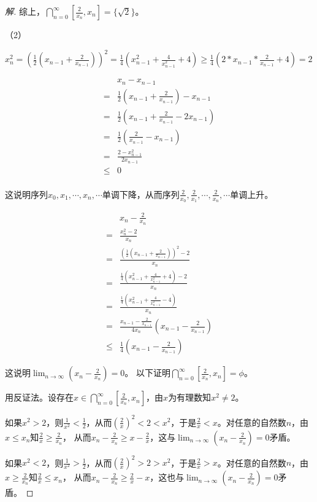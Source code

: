 \documentclass{book}[oneside]
\begin{document}
\begin{CJK*}{UTF8}{gbsn}
\begin{proof}[解]
  综上，$\bigcap_{n=0}^{\infty}[\frac{2}{x_n},x_n]=\{\sqrt{2}\}$。
  
  （2）
  
  $x_n^2=(\frac{1}{2}(x_{n-1}+\frac{2}{x_{n-1}}))^2=\frac{1}{4}(x_{n-1}^2+\frac{4}{x_{n-1}^2}+4)\geq \frac{1}{4}(2*x_{n-1}*\frac{2}{x_{n-1}}+4)=2$
  
  \begin{align*}
    &x_n-x_{n-1}\\
    =&\frac{1}{2}(x_{n-1}+\frac{2}{x_{n-1}})-x_{n-1}\\
    =&\frac{1}{2}(x_{n-1}+\frac{2}{x_{n-1}}-2x_{n-1})\\
    =&\frac{1}{2}(\frac{2}{x_{n-1}}-x_{n-1})\\
    =&\frac{2-x_{n-1}^2}{2x_{n-1}}\\
    \leq& 0\\
  \end{align*}
  
  这说明序列$x_0,x_1,\cdots,x_n,\cdots$单调下降，从而序列$\frac{2}{x_0},\frac{2}{x_1},\cdots,\frac{2}{x_n},\cdots$单调上升。
  
  \begin{align*}
    &x_n-\frac{2}{x_n}\\
  =&\frac{x_n^2-2}{x_n}\\
  =&\frac{(\frac{1}{2}(x_{n-1}+\frac{2}{x_{n-1}}))^2-2}{x_n}\\
  =&\frac{\frac{1}{4}(x_{n-1}^2+\frac{4}{x_{n-1}^2}+4)-2}{x_n}\\
  =&\frac{\frac{1}{4}(x_{n-1}^2+\frac{4}{x_{n-1}^2}-4)}{x_n}\\
  =&\frac{x_{n-1}-\frac{2}{x_{n-1}}}{4x_n}(x_{n-1}-\frac{2}{x_{n-1}})\\
  \leq &\frac{1}{4}(x_{n-1}-\frac{2}{x_{n-1}})
  \end{align*}
  
  这说明$\lim_{n\to\infty}(x_n-\frac{2}{x_n})=0$。
  以下证明$\bigcap_{n=0}^{\infty}[\frac{2}{x_n},x_n]=\phi$。
  
  用反证法。设存在$x\in \bigcap_{n=0}^{\infty}[\frac{2}{x_n},x_n]$，由$x$为有理数知$x^2\neq 2$。
  
  如果$x^2>2$，则$\frac{1}{x^2}<\frac{1}{2}$，从而$(\frac{2}{x})^2<2<x^2$，于是$\frac{2}{x}<x$。对任意的自然数$n$，由$x\leq x_n$知$\frac{2}{x}\geq \frac{2}{x_n}$，
  从而$x_n-\frac{2}{x_n}\geq x-\frac{2}{x}$，这与$\lim_{n\to\infty}(x_n-\frac{2}{x_n})=0$矛盾。
  
  如果$x^2<2$，则$\frac{1}{x^2}>\frac{1}{2}$，从而$(\frac{2}{x})^2>2>x^2$，于是$\frac{2}{x}>x$。对任意的自然数$n$，由$x\geq \frac{2}{x_n}$知$\frac{2}{x}\leq x_n$，
  从而$x_n-\frac{2}{x_n}\geq \frac{2}{x}-x$，这也与$\lim_{n\to\infty}(x_n-\frac{2}{x_n})=0$矛盾。
  

\end{proof}
\end{CJK*}
\end{document}
